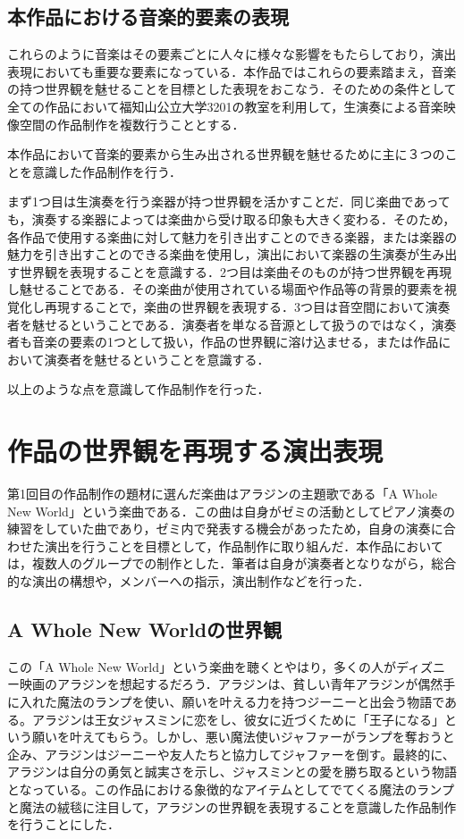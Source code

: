 \subsection{本作品における音楽的要素の表現}
これらのように音楽はその要素ごとに人々に様々な影響をもたらしており，演出表現においても重要な要素になっている．本作品ではこれらの要素踏まえ，音楽の持つ世界観を魅せることを目標とした表現をおこなう．そのための条件として全ての作品において福知山公立大学3201の教室を利用して，生演奏による音楽映像空間の作品制作を複数行うこととする．

本作品において音楽的要素から生み出される世界観を魅せるために主に３つのことを意識した作品制作を行う．

まず1つ目は生演奏を行う楽器が持つ世界観を活かすことだ．同じ楽曲であっても，演奏する楽器によっては楽曲から受け取る印象も大きく変わる．そのため，各作品で使用する楽曲に対して魅力を引き出すことのできる楽器，または楽器の魅力を引き出すことのできる楽曲を使用し，演出において楽器の生演奏が生み出す世界観を表現することを意識する．2つ目は楽曲そのものが持つ世界観を再現し魅せることである．その楽曲が使用されている場面や作品等の背景的要素を視覚化し再現することで，楽曲の世界観を表現する．3つ目は音空間において演奏者を魅せるということである．演奏者を単なる音源として扱うのではなく，演奏者も音楽の要素の1つとして扱い，作品の世界観に溶け込ませる，または作品において演奏者を魅せるということを意識する．

以上のような点を意識して作品制作を行った．





\section{作品の世界観を再現する演出表現}
第1回目の作品制作の題材に選んだ楽曲はアラジンの主題歌である「A Whole New World」\cite{Aladdin}という楽曲である．この曲は自身がゼミの活動としてピアノ演奏の練習をしていた曲であり，ゼミ内で発表する機会があったため，自身の演奏に合わせた演出を行うことを目標として，作品制作に取り組んだ．本作品においては，複数人のグループでの制作とした．筆者は自身が演奏者となりながら，総合的な演出の構想や，メンバーへの指示，演出制作などを行った．

\subsection{A Whole New Worldの世界観}
この「A Whole New World」という楽曲を聴くとやはり，多くの人がディズニー映画のアラジンを想起するだろう．アラジンは、貧しい青年アラジンが偶然手に入れた魔法のランプを使い、願いを叶える力を持つジーニーと出会う物語である。アラジンは王女ジャスミンに恋をし、彼女に近づくために「王子になる」という願いを叶えてもらう。しかし、悪い魔法使いジャファーがランプを奪おうと企み、アラジンはジーニーや友人たちと協力してジャファーを倒す。最終的に、アラジンは自分の勇気と誠実さを示し、ジャスミンとの愛を勝ち取るという物語となっている。この作品における象徴的なアイテムとしてでてくる魔法のランプと魔法の絨毯に注目して，アラジンの世界観を表現することを意識した作品制作を行うことにした．

